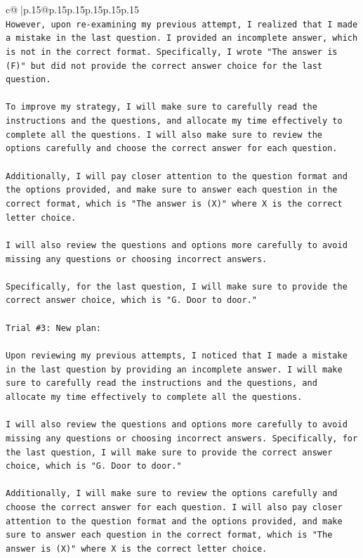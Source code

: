 \documentclass{article}
\begin{document}
{\begin{supertabular}{c@{$\;$}|p{.15\linewidth}@{}p{.15\linewidth}p{.15\linewidth}p{.15\linewidth}p{.15\linewidth}p{.15\linewidth}}
{{{\\ 
\texttt{However, upon re{-}examining my previous attempt, I realized that I made a mistake in the last question. I provided an incomplete answer, which is not in the correct format. Specifically, I wrote "The answer is (F)" but did not provide the correct answer choice for the last question.} \\
\\ 
\texttt{To improve my strategy, I will make sure to carefully read the instructions and the questions, and allocate my time effectively to complete all the questions. I will also make sure to review the options carefully and choose the correct answer for each question. } \\
\\ 
\texttt{Additionally, I will pay closer attention to the question format and the options provided, and make sure to answer each question in the correct format, which is "The answer is (X)" where X is the correct letter choice. } \\
\\ 
\texttt{I will also review the questions and options more carefully to avoid missing any questions or choosing incorrect answers.} \\
\\ 
\texttt{Specifically, for the last question, I will make sure to provide the correct answer choice, which is "G. Door to door."} \\
\\ 
\texttt{Trial \#3: New plan: } \\
\\ 
\texttt{Upon reviewing my previous attempts, I noticed that I made a mistake in the last question by providing an incomplete answer. I will make sure to carefully read the instructions and the questions, and allocate my time effectively to complete all the questions. } \\
\\ 
\texttt{I will also review the questions and options more carefully to avoid missing any questions or choosing incorrect answers. Specifically, for the last question, I will make sure to provide the correct answer choice, which is "G. Door to door." } \\
\\ 
\texttt{Additionally, I will make sure to review the options carefully and choose the correct answer for each question. I will also pay closer attention to the question format and the options provided, and make sure to answer each question in the correct format, which is "The answer is (X)" where X is the correct letter choice. } \\
}}}
\end{supertabular}}
\end{document}
